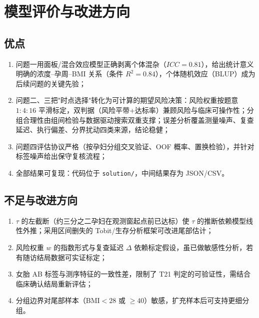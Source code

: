 \documentclass[11pt,a4paper]{ctexart}
\begin{document}
\section{模型评价与改进方向}
\subsection{优点}
\begin{enumerate}
\item 问题一用面板/混合效应模型正确剥离个体混杂（$ICC=0.81$），给出统计意义明确的浓度--孕周--BMI 关系（条件 $R^2=0.84$），个体随机效应（BLUP）成为后续问题的关键先验；
\item 问题二、三把"时点选择"转化为可计算的期望风险决策：风险权重按题意 $1:4:16$ 平滑标定，双判据（风险平带+达标率）兼顾风险与临床可操作性；分组合理性由组间检验与数据驱动搜索双重支撑；误差分析覆盖测量噪声、复查延迟、执行偏差、分界扰动四类来源，结论稳健；
\item 问题四评估协议严格（按孕妇分组交叉验证、OOF 概率、置换检验），并针对标签噪声给出保守复核流程；
\item 全部结果可复现：代码位于 {\tt solution/}，中间结果存为 JSON/CSV。
\end{enumerate}

\subsection{不足与改进方向}
\begin{enumerate}
\item $\tau$ 的左截断（约三分之二孕妇在观测窗起点前已达标）使 $\tau$ 的推断依赖模型线性外推；采用区间删失的 Tobit/生存分析框架可改进尾部估计；
\item 风险权重 $w$ 的指数形式与复查延迟 $\Delta$ 依赖标定假设，虽已做敏感性分析，若有随访结局数据可实证标定；
\item 女胎 AB 标签与测序特征的一致性差，限制了 T21 判定的可验证性，需结合临床确认结局重新评估；
\item 分组边界对尾部样本（BMI$<28$ 或 $\ge40$）敏感，扩充样本后可支持更细分组。
\end{enumerate}
\end{document}
